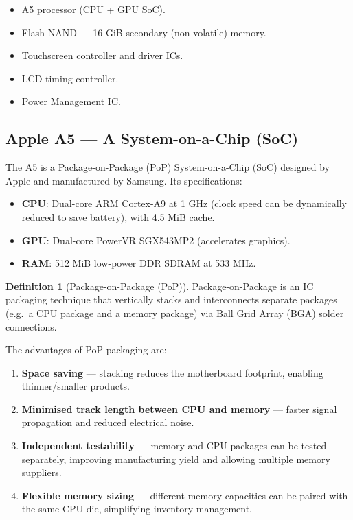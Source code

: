 \documentclass[11pt, a4paper, notitlepage]{report}
\theoremstyle{definition}
\newtheorem{definition}[theorem]{Definition}
\theoremstyle{remark}
\theoremstyle{definition}
\begin{document}
\begin{itemize}
  \item A5 processor (CPU + GPU SoC).
  \item Flash NAND --- 16 GiB secondary (non-volatile) memory.
  \item Touchscreen controller and driver ICs.
  \item LCD timing controller.
  \item Power Management IC.
\end{itemize}

\subsection{Apple A5 --- A System-on-a-Chip (SoC)}

The A5 is a Package-on-Package (PoP) System-on-a-Chip (SoC) designed by Apple and manufactured by Samsung. Its specifications:

\begin{itemize}
  \item \textbf{CPU}: Dual-core ARM Cortex-A9 at 1 GHz (clock speed can be dynamically reduced to save battery), with 4.5 MiB cache.
  \item \textbf{GPU}: Dual-core PowerVR SGX543MP2 (accelerates graphics).
  \item \textbf{RAM}: 512 MiB low-power DDR SDRAM at 533 MHz.
\end{itemize}

\begin{definition}[Package-on-Package (PoP)]
\label{def:pop}
Package-on-Package is an IC packaging technique that vertically stacks and interconnects separate packages (e.g.\ a CPU package and a memory package) via Ball Grid Array (BGA) solder connections.
\end{definition}

The advantages of PoP packaging are:

\begin{enumerate}
  \item \textbf{Space saving} --- stacking reduces the motherboard footprint, enabling thinner/smaller products.
  \item \textbf{Minimised track length between CPU and memory} --- faster signal propagation and reduced electrical noise.
  \item \textbf{Independent testability} --- memory and CPU packages can be tested separately, improving manufacturing yield and allowing multiple memory suppliers.
  \item \textbf{Flexible memory sizing} --- different memory capacities can be paired with the same CPU die, simplifying inventory management.
\end{enumerate}
\end{document}
